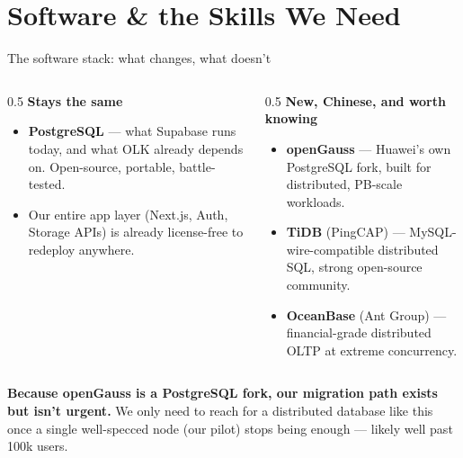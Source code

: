\documentclass[aspectratio=169,10pt]{beamer}
\newcommand{\eyebrow}[1]{{\small\color{sovGold}\textbf{#1}}}
\begin{document}
\section{Software \& the Skills We Need}

\begin{frame}{The software stack: what changes, what doesn't}
  \begin{columns}[T]
    \begin{column}{0.5\textwidth}
      \eyebrow{Stays the same}
      \begin{itemize}
        \item \textbf{PostgreSQL} --- what Supabase runs today, and what OLK already depends on. Open-source, portable, battle-tested.
        \item Our entire app layer (Next.js, Auth, Storage APIs) is already license-free to redeploy anywhere.
      \end{itemize}
    \end{column}
    \begin{column}{0.5\textwidth}
      \eyebrow{New, Chinese, and worth knowing}
      \begin{itemize}
        \item \textbf{openGauss} --- Huawei's own PostgreSQL fork, built for distributed, PB-scale workloads.
        \item \textbf{TiDB} (PingCAP) --- MySQL-wire-compatible distributed SQL, strong open-source community.
        \item \textbf{OceanBase} (Ant Group) --- financial-grade distributed OLTP at extreme concurrency.
      \end{itemize}
    \end{column}
  \end{columns}
  \vspace{8pt}
  \begin{takeaway}
   \textbf{Because openGauss is a PostgreSQL fork, our migration path exists but isn't urgent.} We only need to reach for a distributed database like this once a single well-specced node (our pilot) stops being enough --- likely well past 100k users.
  \end{takeaway}
\end{frame}
\end{document}
